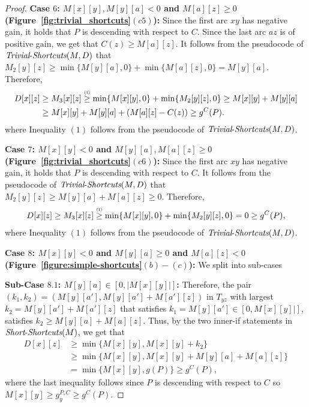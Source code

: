 \documentclass[11pt]{article}
\newcommand{\Simple}{\mbox{{\it Short}-{\it Shortcuts}}}
\newcommand{\Trivial}{\mbox{{\it Trivial}-{\it Shortcuts}}}
\newcommand\numge[1]{\stackrel{\scriptscriptstyle(\mkern-1.5mu#1\mkern-1.5mu)}{\ge}}
\begin{document}
\begin{proof}
    \textbf{Case $6$: $M[x][y], M[y][a] < 0$ and $M[a][z] \ge 0$ (Figure~\ref{fig:trivial_shortcuts}$(c5)$):} 
    Since the first arc $xy$ has negative gain, it holds that $P$ is descending with respect to $C$. Since the last arc $az$ is of positive gain, we get that $C(z) \ge M[a][z]$. It follows from the pseudocode of $\Trivial(M,D)$ that $M_2[y][z] \ge \min \{M[y][a],0\}+ \min \{M[a][z],0\} = M[y][a]$. Therefore,
    \begin{align*}
         D[x][z] &\ge M_3[x][z] \numge{1} \min\{M[x][y],0\} +  \min\{M_2[y][z],0\} \ge M[x][y] +   M[y][a] \\
         &\ge M[x][y] + M[y][a] + (M[a][z] - C(z)) \ge
         g^C(P).
    \end{align*}
    where Inequality $(1)$ follows from the pseudocode of $\Trivial(M,D)$.
    
    \textbf{Case $7$: $M[x][y] < 0$ and $M[y][a],M[a][z] \ge 0$ (Figure~\ref{fig:trivial_shortcuts}$(c6)$):} 
    Since the first arc $xy$ has negative gain, it holds that $P$ is descending with respect to $C$. It follows from the pseudocode of $\Trivial(M,D)$ that $M_2[y][z] \ge M[y][a]+M[a][z] \ge 0$. Therefore,
    \begin{align*}
         D[x][z] \ge M_3[x][z] \numge{1} \min\{M[x][y],0\} +  \min\{M_2[y][z],0\} = 0 \ge g^C(P),
    \end{align*}
    where Inequality $(1)$ follows from the pseudocode of $\Trivial(M,D)$.
    

    \textbf{Case $8$: $M[x][y] < 0 $ and $M[y][a] \ge 0$ and $M[a][z] < 0$ (Figure~\ref{figure:simple-shortcuts}$(b)-(c)$):} 
     We split into sub-cases

    \textbf{Sub-Case $8.1$: $M[y][a]\in [0, |M[x][y]|]$:} Therefore, the pair $(k_1,k_2) = (M[y][a'], M[y][a'] +M[a'][z])$ in $T_{yz}$ with largest $k_2 = M[y][a']+M[a'][z]$ that satisfies $k_1=M[y][a'] \in [0,M[x][y]|]$, satisfies $k_2 \ge M[y][a] +M[a][z]$. Thus, by the two inner-if statements in $\Simple(M)$, we get that
    \begin{align*}
        D[x][z] &\ge \min \{ M[x][y], M[x][y]+k_2 \}\\
        &\ge
        \min \{ M[x][y], M[x][y]+M[y][a]+M[a][z] \}\\
        &=
        \min \{ M[x][y], g(P) \} \ge g^C(P),
    \end{align*}
    where the last inequality follows since $P$ is descending with respect to $C$ so $M[x][y] \ge g^{P,C}_y \ge g^C(P)$.


\end{proof}
\end{document}
